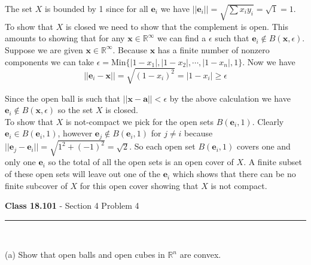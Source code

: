 \documentclass[11pt,reqno]{article}
\begin{document}
The set $X$ is bounded by 1 since for all $\textbf{e}_i$ we have $||\textbf{e}_i|| = \sqrt{\sum x_i y_i} = \sqrt{1} = 1$. To show that $X$ is closed we need to show that the complement is open. This amounts to showing that for any $\textbf{x} \in \mathbb{R}^\infty$ we can find a $\epsilon$ such that $\textbf{e}_i \notin B(\textbf{x},\epsilon)$. \\
Suppose we are given $\textbf{x} \in \mathbb{R}^\infty$. Because $\textbf{x}$ has a finite number of nonzero components we can take $\epsilon = \text{Min} \{ |1-x_1|,|1-x_2|, \cdots, |1 - x_n|,1\}$. Now we have 
\[ ||\textbf{e}_i - \textbf{x}|| = \sqrt{(1-x_i)^2} = |1 - x_i| \ge \epsilon \]

Since the open ball is such that $||\textbf{x}- \textbf{a}|| < \epsilon$ by the above calculation we have $\textbf{e}_i \notin B(\textbf{x},\epsilon)$ so the set $X$ is closed.\\
\indent To show that $X$ is not-compact we pick for the open sets $B(\textbf{e}_i,1)$. Clearly $\textbf{e}_i \in B(\textbf{e}_i,1)$, however $\textbf{e}_j \notin B(\textbf{e}_i,1)$ for $j \neq i$ because $|| \textbf{e}_j - \textbf{e}_i || = \sqrt{1^2  + (-1)^2} = \sqrt{2}$. So each open set $B(\textbf{e}_i,1)$ covers one and only one $\textbf{e}_i$ so the total of all the open sets is an open cover of $X$. A finite subset of these open sets will leave out one of the  $\textbf{e}_i$ which shows that there can be no finite subcover of $X$ for this open cover showing that $X$ is not compact.

\begin{flushleft} 
\textbf{Class 18.101} - Section 4 Problem 4\\
\rule{500pt}{1pt}\\
\end{flushleft} 

\noindent (a) Show that open balls and open cubes in $\mathbb{R}^n$ are convex.\\
\end{document}

